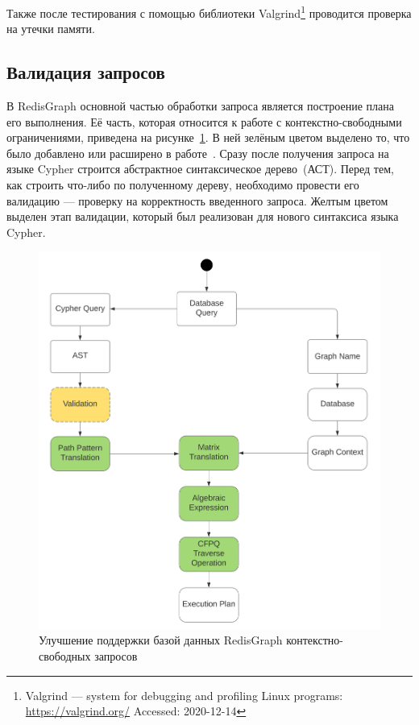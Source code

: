 \documentclass[14pt]{matmex-diploma-custom}
\begin{document}
Также после тестирования с помощью библиотеки Valgrind\footnote{Valgrind --- system for debugging and profiling Linux programs: \url{https://valgrind.org/} Accessed: 2020-12-14} проводится проверка на утечки памяти. 

\subsection{Валидация запросов}
В RedisGraph основной частью обработки запроса является построение плана его выполнения. Её часть, которая относится к работе с контекстно-свободными ограничениями, приведена на рисунке~\ref{valid}. 
В ней зелёным цветом выделено то, что
было добавлено или расширено в работе~\cite{Arseniy-diploma}.
Сразу после получения запроса на языке Cypher строится абстрактное синтаксическое дерево~(АСТ). Перед тем, как строить что-либо по полученному дереву, необходимо провести его валидацию --- проверку на корректность введенного запроса. Желтым цветом выделен этап валидации, который был реализован для нового синтаксиса языка Cypher.

\begin{figure}[h]
\includegraphics[width=12cm]{pictures/RedisGraph Activity Diagram-1.png}
\centering
\captionsetup{justification=centering}
\caption{Улучшение поддержки базой данных RedisGraph контекстно-свободных запросов}
\label{valid}
\end{figure}
\end{document}

